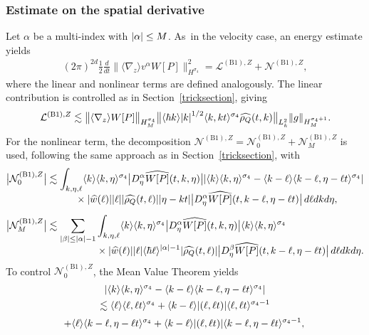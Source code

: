 \documentclass[JEP,XML,SOM,Unicode]{cedram}
\newcommand{\bnorm}[1]{\bigl\|#1\bigr\|}
\newcommand{\babs}[1]{\bigl|#1\bigr|}
\theoremstyle{plain}
\theoremstyle{remark}
\newcommand{\ak}{\abs{k}}
\newcommand{\aal}{\abs{\alpha}}
\newcommand{\jb}[1]{\langle#1\rangle}
\begin{document}
\subsubsection{Estimate on the spatial derivative}
Let $\alpha$ be a multi-index with $\aal\leq M$. As~in the velocity case, an energy estimate yields
\begin{align*}
(2\pi)^{2d}\frac{1}{2}\frac{d}{dt}\bnorm{\jb{\nabla_z}v^\alpha{W[P]}}_{H^{\sigma_4}}^2=\mathcal{L}^{\mathrm{(B1)},Z} + \mathcal{N}^{\mathrm{(B1)},Z},
\end{align*}where the linear and nonlinear terms are defined analogously. The linear contribution is controlled as in Section~\ref{tricksection}, giving
\begin{align*}
\mathcal{L}^{\mathrm{(B1)},Z}\lesssim\bnorm{\jb{\nabla_z}{W[P]}}_{H^{\sigma_4}_M}\bnorm{\jb{\hbar k}\ak^{1/2}\jb{k,kt}^{\sigma_4}\widehat{\rho_Q}(t,k)}_{L^2_{k}}\norm{g}_{H^{\sigma_4+1}_M}.
\end{align*}
For the nonlinear term, the decomposition $\mathcal N^{\mathrm{(B1)},Z}=\mathcal{N}_0^{\mathrm{(B1)},Z}+\mathcal{N}_M^{\mathrm{(B1)},Z}$ is used, following the same approach as in Section~\ref{tricksection}, with
\begin{align*}
\babs{\mathcal{N}_0^{\mathrm{(B1)},Z}}&\lesssim\int_{k,\eta,\ell }\jb{k}\jb{k,\eta}^{\sigma_4}\babs{D_\eta^\alpha \widehat{W[P]}(t,k,\eta)}\abs{\jb{k}\jb{k,\eta}^{\sigma_4}-\jb{k-\ell }\jb{k-\ell ,\eta-\ell t}^{\sigma_4}}\\[-5pt]
&\hspace{1cm}\times\abs{\widehat{w}(\ell )}\abs{\ell }\abs{\widehat{\rho_Q}(t,\ell )}\abs{\eta-kt}\babs{D_\eta^\alpha\widehat{W[P]}(t,k-\ell ,\eta-\ell t)}\,d\ell dkd\eta,\\[5pt]
\babs{\mathcal{N}_M^{\mathrm{(B1)},Z}}&\lesssim\sum_{\abs{\beta}\leq \aal-1}\int_{k,\eta,\ell }\jb{k}\jb{k,\eta}^{\sigma_4}\babs{D_\eta^\alpha \widehat{W[P]}(t,k,\eta)}\jb{k}\jb{k,\eta}^{\sigma_4}\\[-5pt]
&\hspace{1.75cm}\times\abs{\widehat{w}(\ell )}\abs{\ell }\jb{\hbar\ell}^{\aal-1}\abs{\widehat{\rho_Q}(t,\ell )}\babs{D_\eta^\beta\widehat{W[P]}(t,k-\ell ,\eta-\ell t)}\,d\ell dkd\eta.
\end{align*}
To control $\mathcal{N}_0^{\mathrm{(B1)},Z}$, the Mean Value Theorem yields
\begin{multline*}
\abs{\jb{k}\jb{k,\eta}^{\sigma_4}-\jb{k-\ell }\jb{k-\ell ,\eta-\ell t}^{\sigma_4}}\vphantom{2_{A_A}}\\
\lesssim\jb{\ell }\jb{\ell ,\ell t}^{\sigma_4}+\jb{k-\ell }\abs{(\ell ,\ell t)}\jb{\ell ,\ell t}^{\sigma_4-1}\\
+\jb{\ell }\jb{k-\ell ,\eta-\ell t}^{\sigma_4}+\jb{k-\ell }\abs{(\ell ,\ell t)}\jb{k-\ell ,\eta-\ell t}^{\sigma_4-1},\vphantom{2^{B^B}}
\end{multline*}
\end{document}
